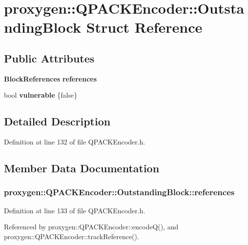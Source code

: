 \section{proxygen\+:\+:Q\+P\+A\+C\+K\+Encoder\+:\+:Outstanding\+Block Struct Reference}
\label{structproxygen_1_1QPACKEncoder_1_1OutstandingBlock}
\subsection*{Public Attributes}
\begin{DoxyCompactItemize}
\item 
{\bf Block\+References} {\bf references}
\item 
bool {\bf vulnerable} \{false\}
\end{DoxyCompactItemize}


\subsection{Detailed Description}


Definition at line 132 of file Q\+P\+A\+C\+K\+Encoder.\+h.



\subsection{Member Data Documentation}
\subsubsection[{references}]{ proxygen\+::\+Q\+P\+A\+C\+K\+Encoder\+::\+Outstanding\+Block\+::references}\label{structproxygen_1_1QPACKEncoder_1_1OutstandingBlock_a9bd9ed2c7fd56e262bbec247630ca855}


Definition at line 133 of file Q\+P\+A\+C\+K\+Encoder.\+h.



Referenced by proxygen\+::\+Q\+P\+A\+C\+K\+Encoder\+::encode\+Q(), and proxygen\+::\+Q\+P\+A\+C\+K\+Encoder\+::track\+Reference().

